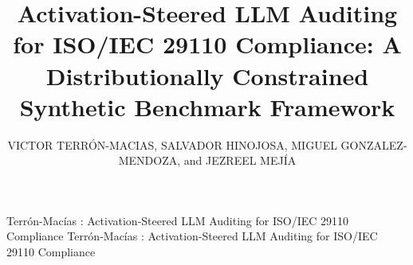 \documentclass{ieeeaccess}
\begin{document}
\hfuzz=10000pt\vfuzz=10000pt
\doi{}

\title{Activation-Steered LLM Auditing for ISO/IEC 29110 Compliance: A Distributionally Constrained Synthetic Benchmark Framework}

\author{\uppercase{Victor Terrón-Macias},
\uppercase{Salvador Hinojosa}, \uppercase{Miguel Gonzalez-Mendoza}, and \uppercase{Jezreel Mejía}}
\address[1]{Tecnologico de Monterrey, Escuela de Ingeniería y Ciencias, Ave. Eugenio Garza Sada 2501 Sur, Col: Tecnológico, Monterrey, N.L., México, 64700. (e-mail: A00843371@tec.mx, salvador.hinojosa@tec.mx, mgonza@tec.mx)}
\address[2]{Centro de Investigación en Matemáticas Unidad Zacatecas, Departamento de Ingeniería de Software (e-mail: jmejia@cimat.mx)}


\markboth
{Terrón-Macías \headeretal: Activation-Steered LLM Auditing for ISO/IEC 29110 Compliance}
{Terrón-Macías \headeretal: Activation-Steered LLM Auditing for ISO/IEC 29110 Compliance}

\end{document}
